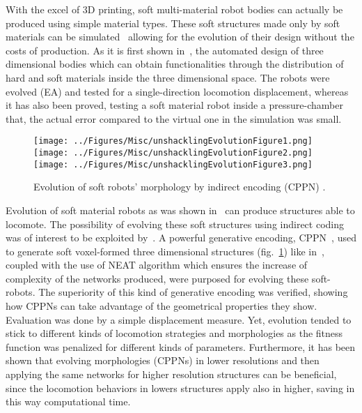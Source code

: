 With the excel of $3$D printing, soft multi-material robot bodies can actually be produced using simple material types. These soft structures made only by soft materials can be simulated~\cite{hiller2012dynamic} allowing for the evolution of their design without the costs of production. As it is first shown in~\cite{hiller2012automatic}, the automated design of three dimensional bodies which can obtain functionalities through the distribution of hard and soft materials inside the three dimensional space. The robots were evolved (EA) and tested for a single-direction locomotion displacement, whereas it has also been proved, testing a soft material robot inside a pressure-chamber that, the actual error compared to the virtual one in the simulation was small.

\begin{figure}[t!]
\centering
\texttt{[image: ../Figures/Misc/unshacklingEvolutionFigure1.png]}\hspace{0.4cm}
\texttt{[image: ../Figures/Misc/unshacklingEvolutionFigure2.png]}\hspace{0.4cm}
\texttt{[image: ../Figures/Misc/unshacklingEvolutionFigure3.png]}
\caption{Evolution of soft robots' morphology by indirect encoding (CPPN) \cite{cheney2013unshackling}.}
\label{fig:unschackling}
\end{figure}

Evolution of soft material robots as was shown in~\cite{hiller2012automatic} can produce structures able to locomote. The possibility of evolving these soft structures using indirect coding was of interest to be exploited by~\cite{cheney2013unshackling}. A powerful generative encoding, CPPN~\cite{stanley2007compositional}, used to generate soft voxel-formed three dimensional structures (fig.~\ref{fig:unschackling}) like in~\cite{hiller2012automatic}, coupled with the use of NEAT algorithm which ensures the increase of complexity of the networks produced, were purposed for evolving these soft-robots. The superiority of this kind of generative encoding was verified, showing how CPPNs can take advantage of the geometrical properties they show. Evaluation was done by a simple displacement measure. Yet, evolution tended to stick to different kinds of locomotion strategies and morphologies as the fitness function was penalized for different kinds of parameters. Furthermore, it has been shown that evolving morphologies (CPPNs) in lower resolutions and then applying the same networks for higher resolution structures can be beneficial, since the locomotion behaviors in lowers structures apply also in higher, saving in this way computational time.


